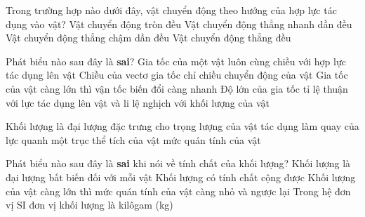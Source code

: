 \begin{ex}%
Trong trường hợp nào dưới đây, vật chuyển động theo hướng của hợp lực tác dụng vào vật?
\choice
{Vật chuyển động tròn đều}
{\True Vật chuyển động thẳng nhanh dần đều}
{Vật chuyển động thẳng chậm dần đều}
{Vật chuyển động thẳng đều}
  \end{ex}
\begin{ex}%
Phát biểu nào sau đây là \textbf{sai}?
\choice
{Gia tốc của một vật luôn cùng chiều với hợp lực tác dụng lên vật}
{\True Chiều của vectơ gia tốc chỉ chiều chuyển động của vật}
{Gia tốc của vật càng lớn thì vận tốc biến đổi càng nhanh}
{Độ lớn của gia tốc tỉ lệ thuận với lực tác dụng lên vật và li lệ nghịch với khối lượng của vật}
 \end{ex}
\begin{ex}%
Khối lượng là đại lượng đặc trưng cho
\choice
{trọng lượng của vật}
{tác dụng làm quay của lực quanh một trục}
{thể tích của vật}
{\True mức quán tính của vật}
  \end{ex}
\begin{ex}%
Phát biểu nào sau đây là \textbf{sai} khi nói về tính chất của khối lượng?
\choice
{Khối lượng là đại lượng bất biến đối với mỗi vật}
{Khối lượng có tính chất cộng được}
{\True Khối lượng của vật càng lớn thì mức quán tính của vật càng nhỏ và ngược lại}
{Trong hệ đơn vị SI đơn vị khối lượng là kilôgam (kg)}
 \end{ex}
